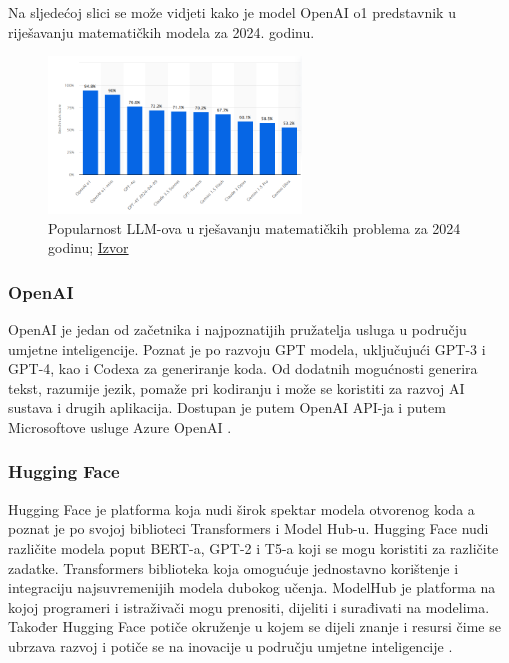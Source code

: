 \documentclass[]{foi}
\begin{document}
Na sljedećoj slici se može vidjeti kako je model OpenAI o1 predstavnik u riješavanju matematičkih modela za 2024. godinu.
\begin{figure}[h]
  \centering
  \includegraphics[width=0.6\textwidth]{./assets/Statista.png}
  \caption{Popularnost LLM-ova u rješavanju matematičkih problema za 2024 godinu; \href{https://www.statista.com/statistics/1458141/leading-math-llm-tools/}{Izvor}}
  \label{fig:slika310}
\end{figure}



\subsubsection{OpenAI}
OpenAI je jedan od začetnika i najpoznatijih pružatelja usluga u području umjetne inteligencije. Poznat je po razvoju GPT modela, uključujući GPT-3 i GPT-4, kao i Codexa za generiranje koda.
Od dodatnih mogućnosti generira tekst, razumije jezik, pomaže pri kodiranju i može se koristiti za razvoj AI sustava i drugih aplikacija. Dostupan je putem OpenAI API-ja i putem Microsoftove usluge
Azure OpenAI \cite{ozkaya2025llm}.

\subsubsection{Hugging Face}
Hugging Face je platforma koja nudi širok spektar modela otvorenog koda a poznat je po svojoj biblioteci Transformers i Model Hub-u. Hugging Face nudi različite modela poput BERT-a, GPT-2 i T5-a koji se mogu koristiti za različite zadatke.
Transformers biblioteka koja omogućuje jednostavno korištenje i integraciju najsuvremenijih modela dubokog učenja. ModelHub je platforma na kojoj programeri i istraživači mogu prenositi, dijeliti i surađivati na modelima. Također Hugging 
Face potiče okruženje u kojem se dijeli znanje i resursi čime se ubrzava razvoj i potiče se na inovacije u području umjetne inteligencije \cite{ozkaya2025llm}.
\end{document}
